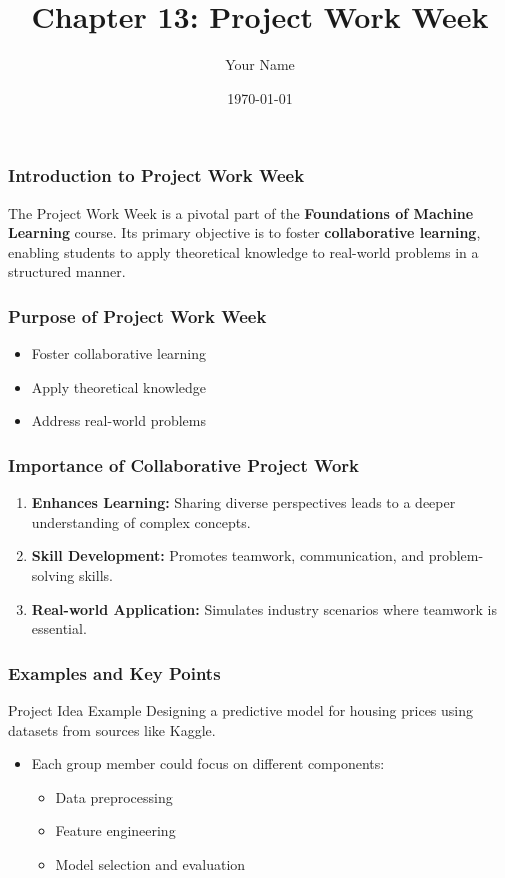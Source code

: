 \documentclass{beamer}
\title{Chapter 13: Project Work Week}
\author{Your Name}
\institute{Your Institution}
\date{\today}
\begin{document}
\frame{\titlepage}

\begin{frame}[fragile]
    \frametitle{Introduction to Project Work Week}
    The Project Work Week is a pivotal part of the \textbf{Foundations of Machine Learning} course.
    Its primary objective is to foster \textbf{collaborative learning}, enabling students to apply theoretical knowledge to real-world problems in a structured manner.
\end{frame}

\begin{frame}[fragile]
    \frametitle{Purpose of Project Work Week}
    \begin{itemize}
        \item Foster collaborative learning
        \item Apply theoretical knowledge
        \item Address real-world problems
    \end{itemize}
\end{frame}

\begin{frame}[fragile]
    \frametitle{Importance of Collaborative Project Work}
    \begin{enumerate}
        \item \textbf{Enhances Learning:} Sharing diverse perspectives leads to a deeper understanding of complex concepts.
        \item \textbf{Skill Development:} Promotes teamwork, communication, and problem-solving skills.
        \item \textbf{Real-world Application:} Simulates industry scenarios where teamwork is essential.
    \end{enumerate}
\end{frame}

\begin{frame}[fragile]
    \frametitle{Examples and Key Points}
    \begin{block}{Project Idea Example}
        Designing a predictive model for housing prices using datasets from sources like Kaggle.
        \begin{itemize}
            \item Each group member could focus on different components:
                \begin{itemize}
                    \item Data preprocessing
                    \item Feature engineering
                    \item Model selection and evaluation
                \end{itemize}
        \end{itemize}
    \end{block}
\end{frame}
\end{document}
